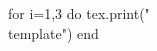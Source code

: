 \documentclass[twoside, 10pt]{article}
\title{}
\date{}
\newcommand{\template}{
\directlua{tex.print(utils.genVersion())}
\noindent
{\large
First Name \rule{6em}{.1pt}\hspace{\stretch{1}} Last Name \rule{6em}{.1pt}\hspace{\stretch{1}} Date \rule{1.5em}{.1pt} -- \rule{1.5em}{.1pt} -- \rule{1.5em}{.1pt}\hspace{\stretch{1}} Period \rule{2em}{.1pt}\hspace{\stretch{1}} Score \rule{2em}{.1pt}
}
\begin{enumerate}
\section*{\normalsize Be Precise. Score \rule{4em}{.4pt}}
\item The standard form of $(-\directlua{tex.print(utils.genRandom(2, 3))}x^{\directlua{tex.print(utils.genRandom(2,10))}})^3$ is \rule{4em}{0.4pt}, the degree is \rule{4em}{0.4pt}, the leading coefficient is \rule{4em}{0.4pt} and the constant value is \rule{4em}{0.4pt}. 
\item Write a polynomial given the following conditions:
\begin{itemize}
\item
the degree of the expression is \directlua{tex.print(utils.genRandom(3, 8))}
\item 
the leading coefficient is \directlua{tex.print(utils.genRandom(-99, 99, false, false, true))}
\item the constant term is \directlua{tex.print(utils.genRandom(-99, 99, false, false, false))}
\end{itemize}
\rule{20em}{.4pt}
\item Find the zeros for each of the following polynomials:
\begin{enumerate}[itemsep=2em]
\item
$(x\directlua{tex.print(a1)})(x\directlua{tex.print(a2)})$\hspace{2em} \rule{15em}{.4pt}
\item
$x(x\directlua{tex.print(b1)})(x\directlua{tex.print(b2)})(x\directlua{tex.print(b3)})$ \hspace{2em} \rule{15em}{.4pt}
\item 
$(x\directlua{tex.print(c1)})^3(x\directlua{tex.print(c2)})^2$ \hspace{2em} \rule{15em}{.4pt}
\item 
$(\directlua{tex.print(d1)}x\directlua{tex.print(d3)}) (\directlua{tex.print(d2)}x \directlua{tex.print(d4)})$ \hspace{2em} \rule{15em}{.4pt}
\end{enumerate}
\item 
Choose one problem to solve:
\begin{enumerate}
\item
(\textbf{Rebuild})
The expression $x^2  + 11x - 80$ is equivalent to 

A. $(x-8)(x+10)$\hfill B. $(x-2)(x+40)$ \hfill C. $(x+2)(x-40)$ \hfill D. $(x+16)(x-5)$ 
\item
(\textbf{Recap})  Factor the polynomial $x^2 +14x -120$.
\vspace{\stretch{1}}
\end{enumerate}
\section*{\normalsize Argue. Score \rule{4em}{.4pt}}
\item Determine the product of $(\directlua{tex.print(d1)}x\directlua{tex.print(a1)})$ and $(-4x^2 + x - 2)$. Express the product in standard form. {\bf Show all your work!}
\vspace{\stretch{1}}
\clearpage
\item Find the result when $\directlua{tex.print(d2)}x^2 \directlua{tex.print(a2)}x + 4$ is subtracted from $x^2 + 2x \directlua{tex.print(d4)}$. {\bf Show all your work!}
\vspace{\stretch{1}}
\item 
Choose one problem to solve. Circle the label of the problem that you choose.
\begin{enumerate}
\item
(\textbf{Rebuild}) Let $f(x) = (x\directlua{tex.print(utils.genRandom(-5,5, true, false, true))})(x\directlua{tex.print(utils.genRandom(-5,5, true, false, true))})(x\directlua{tex.print(utils.genRandom(-5,5, true, false, true))})$. Find all intercepts of $f(x)$ (including both horizontal and vertical). {\bf Show your reasoning!}
\item
(\textbf{Recap}) 
Let $f(x) = (x - 10)(x + 3)$. {\bf Explain} how you will choose the smallest graphing window in the form of ``$-a \leq x\leq a$, $-b \leq y \leq b$'' such that it contains all intercepts (both horizontal and vertical).
\vspace{\stretch{1}}
\end{enumerate}
\section*{\normalsize Model. Score \rule{4em}{.4pt}}
\item Abby has \$\directlua{tex.print(utils.genRandom(20, 30))} to spend at a community festival. She uses \$\directlua{tex.print(utils.genRandom(5, 15))} to purchase food coupons for
popcorn, a hot dog, and a soda. She can buy individual ride tickets for \$\directlua{tex.print(utils.genRandom(2, 6))} each. Determine algebraically the maximum number of ride tickets Abby can buy. {\bf Show your reasoning!}
\vspace{\stretch{1}}
\end{enumerate}
\clearpage
}
\begin{document}
\begin{luacode}
for i=1,3 do
	tex.print("\\template")
end
\end{luacode}
\end{document}
